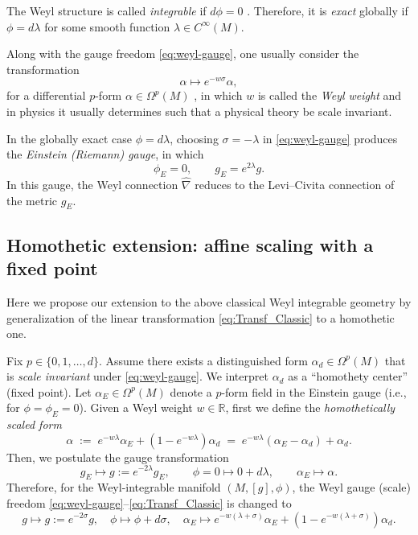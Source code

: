 \documentclass[preprint,12pt]{elsarticle}
\theoremstyle{plain}
\theoremstyle{definition}
\theoremstyle{note}
\newcommand{\R}{\mathbb{R}}
\begin{document}
The Weyl structure is called \emph{integrable} if $d\phi=0$ \cite{SalimSautu1996,RomeroFonsecaNetoPucheu2012}. Therefore, it is \emph{exact} globally if $\phi=d\lambda$ for some smooth function $\lambda\in C^\infty(M)$. 

Along with the gauge freedom \eqref{eq:weyl-gauge}, one usually consider the transformation
\begin{equation}\label{eq:Transf_Classic}
\alpha \mapsto e^{-w\sigma}\alpha,
\end{equation}
for a differential $p$-form $\alpha \in \Omega^p(M)$ \cite{KarananasMonin2016}, in which $w$ is called the \emph{Weyl weight} and in physics it usually determines such that a physical theory be scale invariant.   

In the globally exact case $\phi=d\lambda$, choosing $\sigma=-\lambda$ in \eqref{eq:weyl-gauge} produces the \emph{Einstein (Riemann) gauge}, in which
\begin{equation}\label{eq:einstein-gauge}
\phi_{E}=0,
\qquad
g_{E}=e^{2\lambda}g .
\end{equation}
In this gauge, the Weyl connection $\hat\nabla$ reduces to the Levi--Civita connection of the metric $g_{E}$.

\subsection{Homothetic extension: affine scaling with a fixed point}
Here we propose our extension to the above classical Weyl integrable geometry by generalization of the linear transformation \eqref{eq:Transf_Classic} to a homothetic one.

Fix $p\in\{0,1,\dots,d\}$. Assume there exists a distinguished form $\alpha_d\in\Omega^p(M)$ that is \emph{scale invariant} under \eqref{eq:weyl-gauge}. We interpret $\alpha_d$ as a ``homothety center'' (fixed point). Let $\alpha_E\in\Omega^p(M)$ denote a $p$-form field in the Einstein gauge (i.e., for $\phi=\phi_E=0$). Given a Weyl weight $w\in\R$, first we define the \emph{homothetically scaled form}
\begin{equation}\label{eq:affine-homothety}
\alpha \;:=\; e^{-w\lambda}\alpha_E + (1-e^{-w\lambda})\alpha_d
\;=\; e^{-w\lambda}(\alpha_E-\alpha_d)+\alpha_d.
\end{equation}
Then, we postulate the gauge transformation
\begin{equation}\label{eq:Weyl-extension}
\boxed{
g_E \mapsto g:=e^{-2\lambda}g_E, \qquad \phi=0 \mapsto 0+d \lambda, \qquad \alpha_E \mapsto \alpha.}
\end{equation}
Therefore, for the Weyl-integrable manifold $(M,[g],\phi)$, the Weyl gauge (scale) freedom \eqref{eq:weyl-gauge}--\eqref{eq:Transf_Classic} is changed to 
\begin{equation}\label{eq:Weyl-extension-2}
g \mapsto g:=e^{-2\sigma}g, \quad \phi \mapsto \phi+d \sigma, \quad \alpha_E \mapsto e^{-w(\lambda+\sigma)}\alpha_E+(1-e^{-w(\lambda+\sigma)})\alpha_d.
\end{equation}
\end{document}
